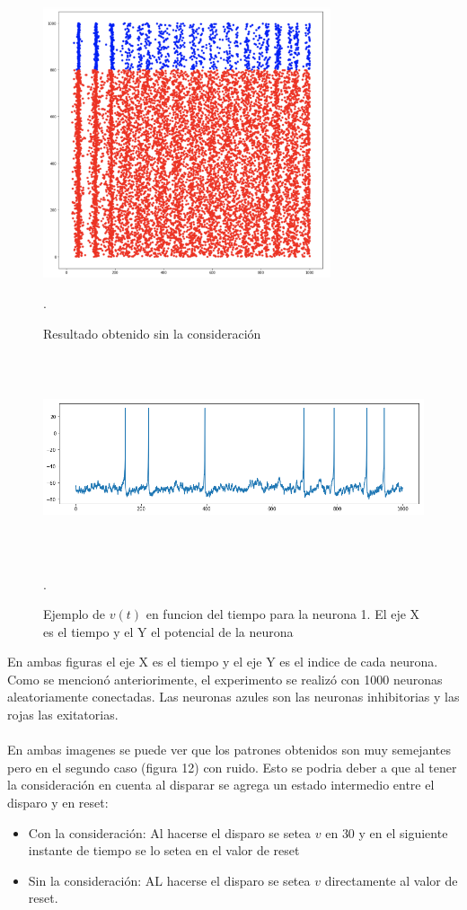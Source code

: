 \documentclass[12pt]{article}
\begin{document}
\begin{figure}[h!]
    \centering
        \includegraphics[height=8cm]{images/resultadoSinNorm.png}
    \caption[fontsize=2pt]{Resultado obtenido sin la consideración}.
\end{figure}

\begin{figure}[h!]
    \centering
        \includegraphics[height=6cm, width=15cm]{images/ejemploNeurona.png}
    \caption[fontsize=2pt]{Ejemplo de $v(t)$ en funcion del tiempo para la neurona 1. El eje X es el tiempo y el Y el potencial de la neurona}.
\end{figure}

\newpage

En ambas figuras el eje X es el tiempo y el eje Y es el indice de cada neurona. Como se mencionó anteriorimente, el experimento se realizó con 1000 neuronas aleatoriamente conectadas.
Las neuronas azules son las neuronas inhibitorias y las rojas las exitatorias. \\ \\

En ambas imagenes se puede ver que los patrones obtenidos son muy semejantes pero en el segundo caso (figura 12) con ruido.
Esto se podria deber a que al tener la consideración en cuenta al disparar se agrega un estado intermedio entre el disparo y en reset:
\begin{itemize}
    \item Con la consideración: Al hacerse el disparo se setea $v$ en $30$ y en el siguiente instante de tiempo se lo setea en el valor de reset
    \item Sin la consideración: AL hacerse el disparo se setea $v$ directamente al valor de reset.
\end{itemize}
\end{document}
